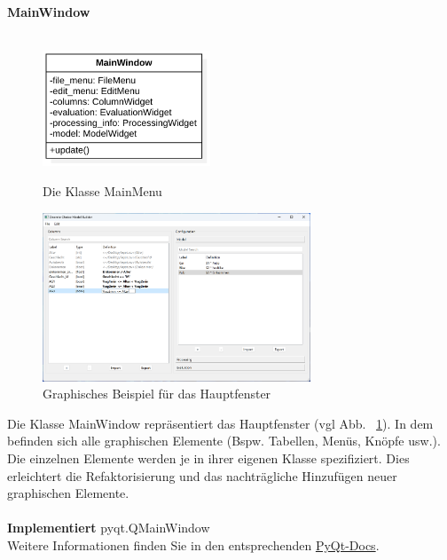 \documentclass{article}
\begin{document}
\newpage
\textbf{\large{MainWindow}}\\\\
\begin{figure}[H]%
    \centering
    \begin{minipage}[b]{0.4\textwidth}
        \centering
        \includegraphics[width=5cm]{entwurf/Entwurf_dokument/img/klassenView/MainWindow.png}
        \caption{Die Klasse MainMenu}
    \end{minipage}
    \hfill
    \begin{minipage}[b]{0.4\textwidth}
        \includegraphics[width=8cm]{specifications/img/gui-screenshots/columns-editing+model.png}
        \caption{Graphisches Beispiel für das Hauptfenster}
        \label{fig:guiMainWindow}
    \end{minipage}
\end{figure}
Die Klasse MainWindow repräsentiert das Hauptfenster (vgl Abb. ~\ref{fig:guiMainWindow}). In dem befinden sich alle graphischen Elemente (Bspw. Tabellen, Menüs, Knöpfe usw.). Die einzelnen Elemente werden je in ihrer eigenen Klasse spezifiziert. Dies erleichtert die Refaktorisierung und das nachträgliche Hinzufügen neuer graphischen Elemente.
\\\\
\textbf{Implementiert} pyqt.QMainWindow\\ Weitere Informationen finden Sie in den entsprechenden \href{https://doc.qt.io/qt-6/qmainwindow.html}{PyQt-Docs}.
\newline 
\end{document}
